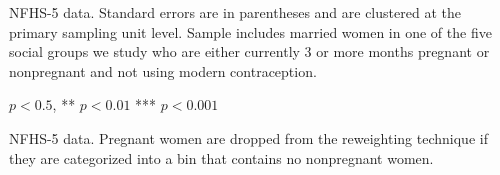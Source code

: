 \documentclass[12pt]{article}
\begin{document}
\newpage

\newpage
\begin{table}[!htbp]
    \centering
    \begin{threeparttable}
        \caption{: Variables used in the nonparametric reweighting predict pregnancy}
        \label{tab:regression}

        \scriptsize
        \setlength{\tabcolsep}{5pt}
        \renewcommand{\arraystretch}{1.5}

        {}

        \begin{tablenotes}
            \item NFHS-5 data. Standard errors are in parentheses and are clustered at the primary sampling unit level. Sample includes married women in one of the five social groups we study who are either currently 3 or more months pregnant or nonpregnant and not using modern contraception.
            \item * $p<0.5$, ** $p<0.01$ *** $p<0.001$ 
        \end{tablenotes}
    \end{threeparttable}
\end{table}

\clearpage
\begin{landscape}

\begin{table}[p]
    \centering
    \small

    \begin{threeparttable}
    
    \caption{: Sample sizes of 3+ month pregnant women in each subgroup and the \% of pregnant women dropped to estimate pre-pregnancy underweight}
    \label{tab:sampledropped}

    \renewcommand{\arraystretch}{1}
    \resizebox{\linewidth}{!}{%
        
    }
    
    \begin{tablenotes}
    \footnotesize
    \item \parbox{\linewidth}{
        NFHS-5 data. Pregnant women are dropped from the reweighting technique if they are categorized into a bin that contains no nonpregnant women.
    }
    \end{tablenotes}

    \end{threeparttable}
\end{table}

\end{landscape}
\clearpage
\end{document}
